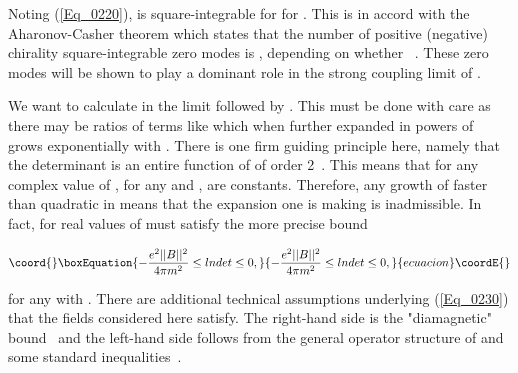 \documentclass[a4paper,twocolumn,showpacs,preprintnumbers,amsmath,amssymb]{revtex4}
\providecommand{\gap}{\vspace{3mm}}
\begin{document}
\gap
\noindent
Noting (\ref{Eq_0220}), \coordHE{} is square-integrable for
\coordHE{} for \coordHE{}. This is in accord
with the Aharonov-Casher theorem which states that the number of
positive (negative) chirality square-integrable zero modes is
\myHighlight{$[|e\Phi|/2\pi]$}\coordHE{}, depending on whether \coordHE{}  \coordHE{}~\cite{Aharonov79}. These zero modes will be shown to
play a dominant role in the strong coupling limit of \coordHE{}.

We want to calculate \coordHE{} in the limit \coordHE{} followed by
\coordHE{}. This must be done with care as there may be ratios of
terms like \coordHE{} which when
further expanded in powers of \coordHE{} grows exponentially with
\coordHE{}. There is one firm guiding principle here, namely that the
determinant is an entire function of \coordHE{} of order
2~\cite{Seiler75,Seiler82}. This means that for any complex value of \coordHE{},
\coordHE{}
for any \coordHE{} and \coordHE{}, \coordHE{} are
constants. Therefore, any growth of \coordHE{} faster than quadratic in
\coordHE{} means that the expansion one is making is inadmissible. In fact,
for real values of \coordHE{}  \coordHE{} must satisfy the more precise bound

\begin{equation}\coord{}\boxEquation{
\label{Eq_0230}
-\frac{e^2||B||^2}{4\pi m^2} \leq lndet \leq 0,
}{
-\frac{e^2||B||^2}{4\pi m^2} \leq lndet \leq 0,
}{ecuacion}\coordE{}\end{equation}

\noindent
for any \coordHE{} with \coordHE{}.
There are additional technical assumptions underlying
(\ref{Eq_0230}) that the fields considered here satisfy.
The right-hand side is the "diamagnetic"
bound~\cite{Seiler81,Seiler82,Brydges79,Weingarten80} and the
left-hand side follows from the general operator structure of \coordHE{}
and some standard inequalities~\cite{Fry02}.
\end{document}
